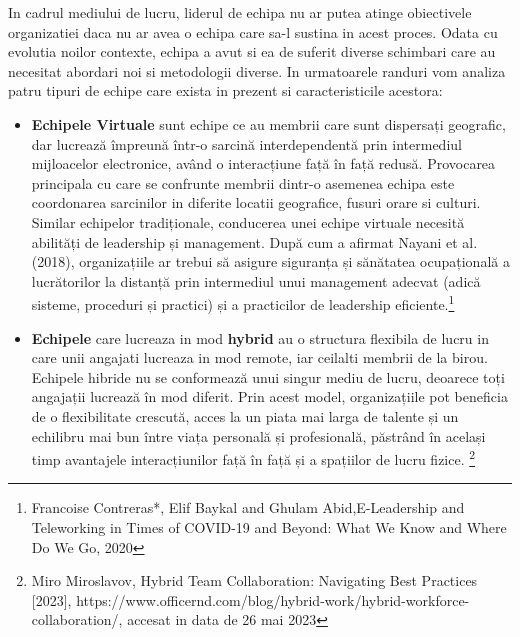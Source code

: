 \documentclass[a4paper, 12pt]{article}
\begin{document}
	\quad\quad In cadrul mediului de lucru, liderul de echipa nu ar putea atinge obiectivele organizatiei daca nu ar avea o echipa care sa-l sustina in acest proces. Odata cu evolutia noilor contexte, echipa a avut si ea de suferit diverse schimbari care au necesitat abordari noi si metodologii diverse. In urmatoarele randuri vom analiza  patru tipuri de echipe care exista in prezent si caracteristicile acestora:

%
	\begin{itemize}

	\item \textbf{Echipele Virtuale} sunt echipe ce au membrii care sunt dispersați geografic, dar lucrează împreună într-o sarcină interdependentă prin intermediul mijloacelor electronice, având o interacțiune față în față redusă. Provocarea principala cu care se confrunte membrii dintr-o asemenea echipa este coordonarea sarcinilor in diferite locatii geografice, fusuri orare si culturi. Similar echipelor tradiționale, conducerea unei echipe virtuale necesită abilități de leadership și management. După cum a afirmat Nayani et al. (2018), organizațiile ar trebui să asigure siguranța și sănătatea ocupațională a lucrătorilor la distanță prin intermediul unui management adecvat (adică sisteme, proceduri și practici) și a practicilor de leadership eficiente.\footnote{Francoise Contreras*, Elif Baykal and Ghulam Abid,E-Leadership and Teleworking in Times of COVID-19 and Beyond: What We Know and Where Do We Go, 2020}

	\item \textbf{Echipele} care lucreaza in mod \textbf{hybrid} au o structura flexibila de lucru in care unii angajati lucreaza in mod remote, iar ceilalti membrii de la birou. Echipele hibride nu se conformează unui singur mediu de lucru, deoarece toți angajații lucrează în mod diferit. Prin acest model, organizațiile pot beneficia de o flexibilitate crescută, acces la un piata mai larga de talente și un echilibru mai bun între viața personală și profesională, păstrând în același timp avantajele interacțiunilor față în față și a spațiilor de lucru fizice. \footnote{Miro Miroslavov, Hybrid Team Collaboration: Navigating Best Practices [2023], https://www.officernd.com/blog/hybrid-work/hybrid-workforce-collaboration/,  accesat in data de 26 mai 2023}


\end{itemize}
\end{document}
